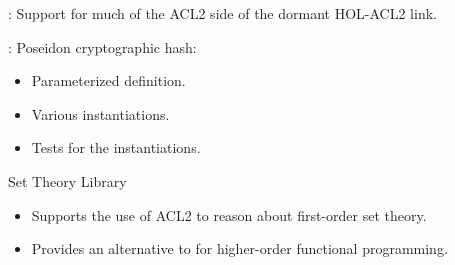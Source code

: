 
\begin{frame}

\newlibtitle

:
Support for much of the ACL2 side of the dormant HOL-ACL2 link.

\end{frame}


\begin{frame}

\newlibtitle

:
Poseidon cryptographic hash:
\begin{itemize}
\item Parameterized definition.
\item Various instantiations.
\item Tests for the instantiations.
\end{itemize}

\end{frame}


\begin{frame}

\newlibtitle

Set Theory Library
\begin{itemize}
\item Supports the use of ACL2 to reason about first-order set theory.
\item Provides an alternative to  for higher-order
      functional programming.
\end{itemize}

\end{frame}


